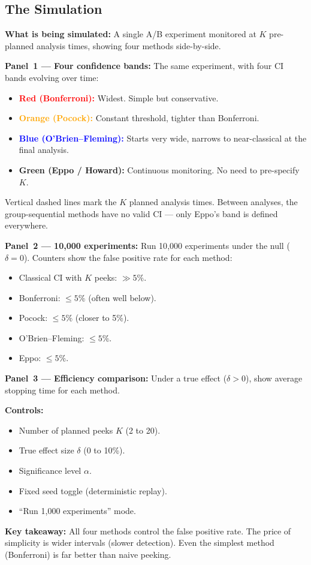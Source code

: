 \documentclass[12pt, a4paper]{article}
\begin{document}
\subsection{The Simulation}

\begin{simulation}
\textbf{What is being simulated:}
A single A/B experiment monitored at $K$ pre-planned analysis times, showing
four methods side-by-side.

\textbf{Panel~1 --- Four confidence bands:}
The same experiment, with four CI bands evolving over time:
\begin{itemize}[nosep]
  \item \textcolor{red}{\textbf{Red (Bonferroni):}} Widest.  Simple but
        conservative.
  \item \textcolor{orange}{\textbf{Orange (Pocock):}} Constant threshold,
        tighter than Bonferroni.
  \item \textcolor{blue}{\textbf{Blue (O'Brien--Fleming):}} Starts very wide,
        narrows to near-classical at the final analysis.
  \item \textcolor{green!60!black}{\textbf{Green (Eppo / Howard):}}
        Continuous monitoring.  No need to pre-specify $K$.
\end{itemize}

Vertical dashed lines mark the $K$ planned analysis times.  Between analyses,
the group-sequential methods have no valid CI --- only Eppo's band is defined
everywhere.

\textbf{Panel~2 --- 10{,}000 experiments:}
Run 10{,}000 experiments under the null ($\delta = 0$).  Counters show the
false positive rate for each method:
\begin{itemize}[nosep]
  \item Classical CI with $K$ peeks: $\gg 5\%$.
  \item Bonferroni: $\leq 5\%$ (often well below).
  \item Pocock: $\leq 5\%$ (closer to 5\%).
  \item O'Brien--Fleming: $\leq 5\%$.
  \item Eppo: $\leq 5\%$.
\end{itemize}

\textbf{Panel~3 --- Efficiency comparison:}
Under a true effect ($\delta > 0$), show average stopping time for each
method.

\textbf{Controls:}
\begin{itemize}[nosep]
  \item Number of planned peeks $K$ (2 to 20).
  \item True effect size $\delta$ (0 to 10\%).
  \item Significance level $\alpha$.
  \item Fixed seed toggle (deterministic replay).
  \item ``Run 1{,}000 experiments'' mode.
\end{itemize}

\textbf{Key takeaway:}
All four methods control the false positive rate.  The price of simplicity
is wider intervals (slower detection).  Even the simplest method
(Bonferroni) is far better than naive peeking.
\end{simulation}
\end{document}
